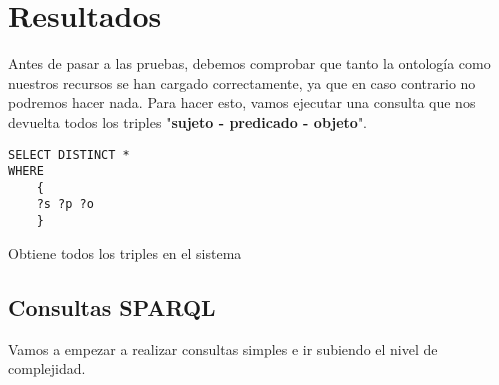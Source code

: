 \chapter{Resultados}

Antes de pasar a las pruebas, debemos comprobar que tanto la ontología como nuestros recursos se han cargado correctamente, ya que en caso contrario no podremos hacer nada. Para hacer esto, vamos ejecutar una consulta que nos devuelta todos los triples "{\bf sujeto - predicado - objeto}".

\begin{listing}[!ht]
\begin{verbatim}
SELECT DISTINCT *
WHERE
	{
	?s ?p ?o
	}
\end{verbatim}
\caption{Obtiene todos los triples en el sistema}
\end{listing}

\section{Consultas SPARQL}

Vamos a empezar a realizar consultas simples e ir subiendo el nivel de complejidad.